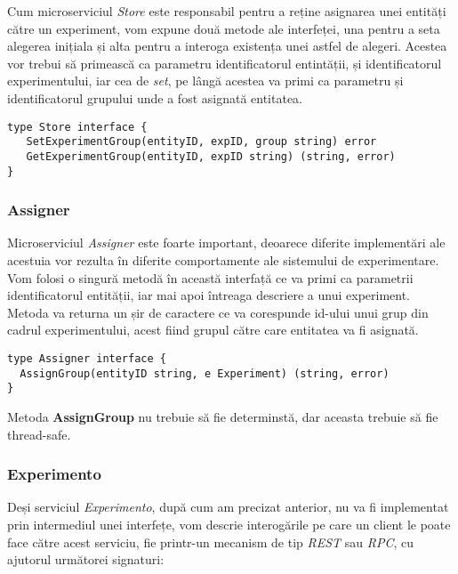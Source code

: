 Cum microserviciul \textit{Store} este responsabil pentru a reține asignarea unei entități către un experiment, vom expune două metode ale interfeței, una pentru a seta alegerea inițiala și alta pentru a interoga existența unei astfel de alegeri. Acestea vor trebui să primească ca parametru identificatorul entintății, și identificatorul experimentului, iar cea de \textit{set}, pe lângă acestea va primi ca parametru și identificatorul grupului unde a fost asignată entitatea.

\break

\begin{center}
	\begin{lstlisting}[language=proto3]
type Store interface {
   SetExperimentGroup(entityID, expID, group string) error
   GetExperimentGroup(entityID, expID string) (string, error)
}
	\end{lstlisting}
\end{center}

\subsubsection{Assigner}

Microserviciul \textit{Assigner} este foarte important, deoarece diferite implementări ale acestuia vor rezulta în diferite comportamente ale sistemului de experimentare. Vom folosi o singură metodă în această interfață ce va primi ca parametrii identificatorul entității, iar mai apoi întreaga descriere a unui experiment. Metoda va returna un șir de caractere ce va corespunde id-ului unui grup din cadrul experimentului, acest fiind grupul către care entitatea va fi asignată.

\begin{center}
	\begin{lstlisting}[language=proto3]
type Assigner interface {
  AssignGroup(entityID string, e Experiment) (string, error)
}
	\end{lstlisting}
\end{center}

\begin{remark}
	Metoda \textbf{AssignGroup} nu trebuie să fie determinstă, dar aceasta trebuie să fie thread-safe.
\end{remark}

\subsubsection{Experimento}

Deși serviciul \textit{Experimento}, după cum am precizat anterior, nu va fi implementat prin intermediul unei interfețe, vom descrie interogările pe care un client le poate face către acest serviciu, fie printr-un mecanism de tip \textit{REST} sau \textit{RPC}, cu ajutorul următorei signaturi:

